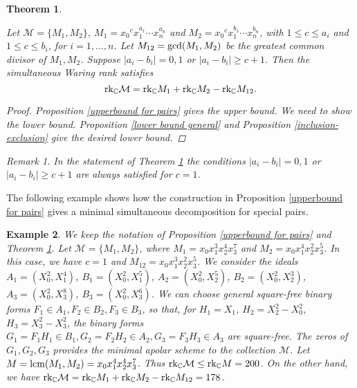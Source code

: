 \documentclass{amsart}
\theoremstyle{plain}
\newtheorem{theorem}{Theorem}[section]
\newtheorem{example}[theorem]{Example}
\theoremstyle{definition}
\theoremstyle{remark}
\newtheorem{remark}{Remark}[section]
\begin{document}
\begin{theorem}\label{sim Waring for pairs}

Let $\mathcal M=\lbrace M_1, M_2\rbrace$, $M_1={x_0}^{c}x_1^{a_1}\cdots x_n^{a_n}$ and $M_2={x_0}^{c}x_1^{b_1}\cdots x_n^{b_n}$, with $1\leq c \leq a_i$ and $1\leq c \leq b_i$, for $i=1,\ldots,n$. Let $M_{12} = \textnormal{gcd}(M_1,M_2)$ be the greatest common divisor of $M_1,M_2$. Suppose $| a_ i - b_i | = 0,1$ or $| a_ i - b_i |\geq c+1$. Then the simultaneous Waring rank satisfies
$$
\textnormal{rk}_{\mathbb C} \mathcal M = \textnormal{rk}_{\mathbb C} M_1+\textnormal{rk}_{\mathbb C} M_2 - \textnormal{rk}_{\mathbb C} M_{12}.
$$

\begin{proof}
Proposition \ref{upperbound for pairs} gives the upper bound. We need to show the lower bound. Proposition \ref{lower bound general} and Proposition \ref{inclusion-exclusion} give the desired lower bound.
\end{proof}

\begin{remark}

In the statement of Theorem \ref{sim Waring for pairs} the conditions $| a_ i - b_i | = 0,1$ or $| a_ i - b_i |\geq c+1$ are always satisfied for $c=1$.

\end{remark}

\end{theorem}

The following example shows how the construction in Proposition \ref{upperbound for pairs} gives a minimal simultaneous decomposition for special pairs.

\begin{example}\label{ex1}
We keep the notation of Proposition \ref{upperbound for pairs} and Theorem \ref{sim Waring for pairs}. Let $\mathcal M = \lbrace M_1, M_2 \rbrace$, where $M_1 = x_0x_1^3x_2^4x_3^7$ and $M_2=x_0x_1^4x_2^2x_3^5$. In this case, we have $c=1$ and $M_{12} = x_0x_1^3x_2^2x_3^5$. We consider the ideals
$A_1=(X_0^2,X_1^4)$, $B_1=(X_0^2,X_1^5)$, $A_2=(X_0^2,X_2^5)$, $B_2=(X_0^2,X_2^3)$, $A_3=(X_0^2,X_3^8)$, $B_3=(X_0^2,X_3^6)$. We can choose general square-free binary forms $F_1\in A_1, F_2\in B_2, F_3\in B_3$, so that, for $H_1 = X_1$, $H_2 = X_2^2-X_0^2$, $H_3 = X_3^2-X_3^2$, the binary forms
$G_1 = F_1H_1\in B_1, G_2 = F_2H_2\in A_2, G_3 = F_3H_3\in A_3$ are square-free. The zeros of $G_1, G_2, G_3$ provides the minimal apolar scheme to the collection $\mathcal M$. Let $M = \textnormal{lcm}(M_1,M_2) = x_0x_1^4x_2^4x_3^7$. Thus $\textnormal{rk}_{\mathbb C} \mathcal M \leq \textnormal{rk}_{\mathbb C} M = 200$. On the other hand, we have $\textnormal{rk}_{\mathbb C} \mathcal M = \textnormal{rk}_{\mathbb C} M_1 + \textnormal{rk}_{\mathbb C} M_2 - \textnormal{rk}_{\mathbb C} M_{12} = 178$.
\end{example}
\end{document}
